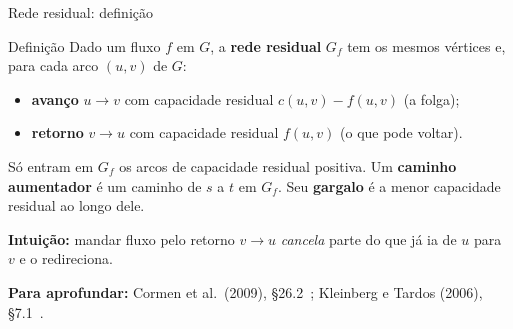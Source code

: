 \documentclass[aspectratio=169,xcolor=table]{beamer}
\newcommand{\fonte}[1]{%
  \vfill
  {\tiny\color{gray!55!black}\textbf{Para aprofundar:} #1\par}%
}
\begin{document}
\begin{frame}{Rede residual: definição}
  \begin{block}{Definição}
    \small
    Dado um fluxo $f$ em $G$, a \textbf{rede residual} $G_f$ tem os mesmos vértices e, para
    cada arco $(u,v)$ de $G$:
    \begin{itemize}
      \item \textbf{avanço} $u \to v$ com capacidade residual $c(u,v) - f(u,v)$ (a folga);
      \item \textbf{retorno} $v \to u$ com capacidade residual $f(u,v)$ (o que pode voltar).
    \end{itemize}
    Só entram em $G_f$ os arcos de capacidade residual positiva.
    Um \textbf{caminho aumentador} é um caminho de $s$ a $t$ em $G_f$. Seu
    \textbf{gargalo} é a menor capacidade residual ao longo dele.
  \end{block}
  {\small\textbf{Intuição:} mandar fluxo pelo retorno $v \to u$ \emph{cancela} parte do que
  já ia de $u$ para $v$ e o redireciona.\par}
  \fonte{Cormen et al.\ (2009), \S 26.2~\cite{cormen2009introduction};
    Kleinberg e Tardos (2006), \S 7.1~\cite{kleinberg2006algorithm}.}
\end{frame}
\end{document}
